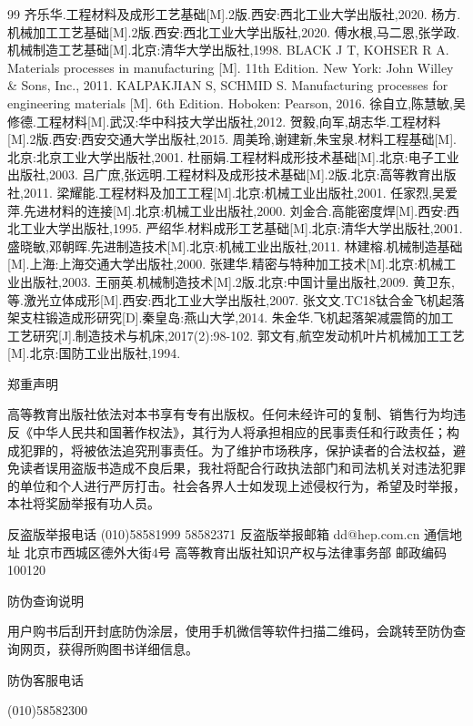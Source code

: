 \documentclass[UTF8]{ctexbook}
\newcommand{\◎}{\ensuremath{\bigcirc}}
\begin{document}
\begin{thebibliography}{99}
     齐乐华.工程材料及成形工艺基础[M].2版.西安:西北工业大学出版社,2020.
     杨方.机械加工工艺基础[M].2版.西安:西北工业大学出版社,2020.
     傅水根,马二恩,张学政.机械制造工艺基础[M].北京:清华大学出版社,1998.
     BLACK J T, KOHSER R A. Materials processes in manufacturing [M]. 11th Edition. New York: John Willey \& Sons, Inc., 2011.
     KALPAKJIAN S, SCHMID S. Manufacturing processes for engineering materials [M]. 6th Edition. Hoboken: Pearson, 2016.
     徐自立,陈慧敏,吴修德.工程材料[M].武汉:华中科技大学出版社,2012.
     贺毅,向军,胡志华.工程材料[M].2版.西安:西安交通大学出版社,2015.
     周美玲,谢建新,朱宝泉.材料工程基础[M].北京:北京工业大学出版社,2001.
     杜丽娟.工程材料成形技术基础[M].北京:电子工业出版社,2003.
     吕广庶,张远明.工程材料及成形技术基础[M].2版.北京:高等教育出版社,2011.
     梁耀能.工程材料及加工工程[M].北京:机械工业出版社,2001.
     任家烈,吴爱萍.先进材料的连接[M].北京:机械工业出版社,2000.
     刘金合.高能密度焊[M].西安:西北工业大学出版社,1995.
     严绍华.材料成形工艺基础[M].北京:清华大学出版社,2001.
     盛晓敏,邓朝晖.先进制造技术[M].北京:机械工业出版社,2011.
     林建榕.机械制造基础[M].上海:上海交通大学出版社,2000.
     张建华.精密与特种加工技术[M].北京:机械工业出版社,2003.
     王丽英.机械制造技术[M].2版.北京:中国计量出版社,2009.
     黄卫东,等.激光立体成形[M].西安:西北工业大学出版社,2007.
     张文文.TC18钛合金飞机起落架支柱锻造成形研究[D].秦皇岛:燕山大学,2014.
     朱金华.飞机起落架减震筒的加工工艺研究[J].制造技术与机床,2017(2):98-102.
     郭文有,航空发动机叶片机械加工工艺[M].北京:国防工业出版社,1994.
\end{thebibliography}

郑重声明

高等教育出版社依法对本书享有专有出版权。任何未经许可的复制、销售行为均违反《中华人民共和国著作权法》，其行为人将承担相应的民事责任和行政责任；构成犯罪的，将被依法追究刑事责任。为了维护市场秩序，保护读者的合法权益，避免读者误用盗版书造成不良后果，我社将配合行政执法部门和司法机关对违法犯罪的单位和个人进行严厉打击。社会各界人士如发现上述侵权行为，希望及时举报，本社将奖励举报有功人员。

反盗版举报电话 (010)58581999 58582371
反盗版举报邮箱 dd@hep.com.cn
通信地址 北京市西城区德外大街4号
高等教育出版社知识产权与法律事务部
邮政编码 100120

防伪查询说明

用户购书后刮开封底防伪涂层，使用手机微信等软件扫描二维码，会跳转至防伪查询网页，获得所购图书详细信息。

防伪客服电话

(010)58582300
\end{document}
